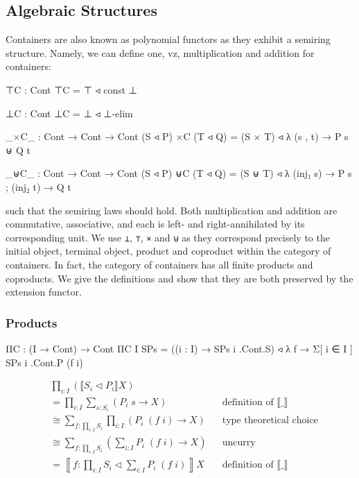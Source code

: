 {\subsection{Algebraic Structures}

Containers are also known as polynomial functors as they exhibit a semiring structure. Namely, we can define one, vz, multiplication and addition for containers:

\begin{code}
⊤C : Cont
⊤C = ⊤ ◃ const ⊥

⊥C : Cont
⊥C = ⊥ ◃ ⊥-elim

_×C_ : Cont → Cont → Cont
(S ◃ P) ×C (T ◃ Q) = (S × T) ◃ λ (s , t) → P s ⊎ Q t

_⊎C_ : Cont → Cont → Cont
(S ◃ P) ⊎C (T ◃ Q) = (S ⊎ T) ◃ λ{ (inj₁ s) → P s ; (inj₂ t) → Q t }
\end{code}

such that the semiring laws should hold. Both multiplication and addition are commutative, associative, and each is left- and right-annihilated by its corresponding unit. We use \texttt{⊥}, \texttt{⊤}, \texttt{×} and \texttt{⊎} as they correspond precisely to the initial object, terminal object, product and coproduct within the category of containers. In fact, the category of containers has all finite products and coproducts. We give the definitions and show that they are both preserved by the extension functor.

\subsubsection*{Products}

\begin{code}
ΠC : (I → Cont) → Cont
ΠC {I} SPs = ((i : I) → SPs i .Cont.S) ◃ λ f → Σ[ i ∈ I ] SPs i .Cont.P (f i)
\end{code}

\begin{align*}
& \prod_{i : I} (\llbracket S_i \triangleleft P_i \rrbracket X) \\
&= \prod_{i : I} \sum_{s : S_i} (P_i \; s \to X) && \text{definition of $\llbracket \_ \rrbracket$} \\
&\cong \sum_{f : \prod_{i : I} S_i} \prod_{i : I} (P_i \; (f \; i) \to X) && \text{type theoretical choice} \\
&\cong \sum_{f : \prod_{i : I} S_i} \left( \sum_{i : I} P_i \; (f \; i) \to X \right) && \text{uncurry} \\
&= \left\llbracket f : \prod_{i : I} S_i \triangleleft \sum_{i : I} P_i \; (f \; i) \right\rrbracket X && \text{definition of $\llbracket \_ \rrbracket$} \\
\end{align*}

}
